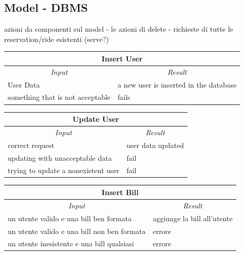 \documentclass[english]{article}
\begin{document}


\subsection{Model - DBMS}
azioni da componenti sul model
- le azioni di delete
- richieste di tutte le reservation/ride esistenti (serve?)

\begin{center}
	\begin{tabular}{ | m{6cm} | m{6cm} | }
		\hline 
		\multicolumn{2}{|c|}{\textbf{Insert User}} \\
		\hline
		\multicolumn{1}{|c|}{\textit{Input}} & \multicolumn{1}{c|}{\textit{Result}} \\
		\hline
		User Data & a new user is inserted in the database \\
		\hline
		something that is not acceptable & fails \\
		\hline
	\end{tabular}
\end{center}
\begin{center}
	\begin{tabular}{ | m{6cm} | m{6cm} | }
		\hline 
		\multicolumn{2}{|c|}{\textbf{Update User}} \\
		\hline
		\multicolumn{1}{|c|}{\textit{Input}} & \multicolumn{1}{c|}{\textit{Result}} \\
		\hline
		correct request & user data updated \\
		\hline
		updating with unacceptable data & fail \\
		\hline
		trying to update a nonexistent user & fail \\
		\hline
	\end{tabular}
\end{center}

\begin{center}
	\begin{tabular}{ | m{6cm} | m{6cm} | }
		\hline 
		\multicolumn{2}{|c|}{\textbf{Insert Bill}} \\
		\hline
		\multicolumn{1}{|c|}{\textit{Input}} & \multicolumn{1}{c|}{\textit{Result}} \\
		\hline
		un utente valido e una bill ben formata & aggiunge la bill all'utente \\
		\hline
		un utente valido e una bill non ben formata & errore \\
		\hline
		un utente inesistente e una bill qualsiasi & errore \\
		\hline
	\end{tabular}
\end{center}
\end{document}
